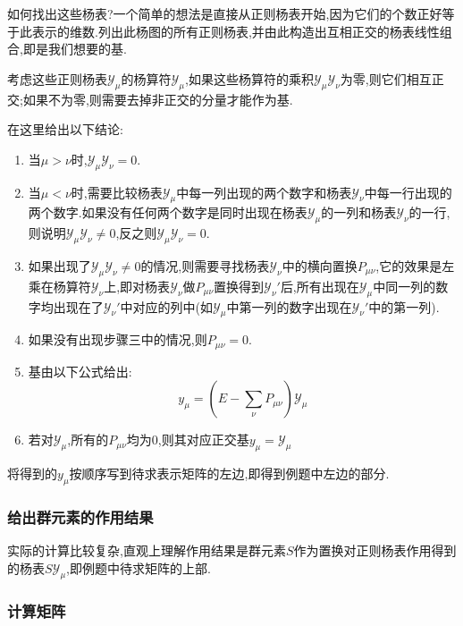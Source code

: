 \documentclass{ctexart}
\begin{document}
如何找出这些杨表?一个简单的想法是直接从正则杨表开始,因为它们的个数正好等于此表示的维数.列出此杨图的所有正则杨表,并由此构造出互相正交的杨表线性组合,即是我们想要的基.

考虑这些正则杨表$\mathcal{Y}_{\mu}$的杨算符$\mathcal{Y}_{\mu}$,如果这些杨算符的乘积$\mathcal{Y}_{\mu}\mathcal{Y}_{\nu}$为零,则它们相互正交;如果不为零,则需要去掉非正交的分量才能作为基.

在这里给出以下结论:
\begin{enumerate}
    \item 当$\mu>\nu$时,$\mathcal{Y}_{\mu}\mathcal{Y}_{\nu}=0$.
    \item 当$\mu<\nu$时,需要比较杨表$\mathcal{Y}_{\mu}$中每一列出现的两个数字和杨表$\mathcal{Y}_{\nu}$中每一行出现的两个数字.如果没有任何两个数字是同时出现在杨表$\mathcal{Y}_{\mu}$的一列和杨表$\mathcal{Y}_{\nu}$的一行,则说明$\mathcal{Y}_{\mu}\mathcal{Y}_{\nu}\neq 0$,反之则$\mathcal{Y}_{\mu}\mathcal{Y}_{\nu}=0$.
    \item 如果出现了$\mathcal{Y}_{\mu}\mathcal{Y}_{\nu}\neq 0$的情况,则需要寻找杨表$\mathcal{Y}_{\nu}$中的横向置换$P_{\mu\nu}$,它的效果是左乘在杨算符$\mathcal{Y}_{\nu}$上,即对杨表$\mathcal{Y}_{\nu}$做$P_{\mu\nu}$置换得到$\mathcal{Y}_{\nu}'$后,所有出现在$\mathcal{Y}_{\mu}$中同一列的数字均出现在了$\mathcal{Y}_{\nu}'$中对应的列中(如$\mathcal{Y}_{\mu}$中第一列的数字出现在$\mathcal{Y}_{\nu}'$中的第一列).
    \item 如果没有出现步骤三中的情况,则$P_{\mu\nu}=0$.
    \item 基由以下公式给出:\[y_{\mu}=\left(E-\sum_{\nu}P_{\mu\nu}\right)\mathcal{Y}_{\mu}\]
    \item 若对$\mathcal{Y}_{\mu}$,所有的$P_{\mu\nu}$均为0,则其对应正交基$y_{\mu}=\mathcal{Y}_{\mu}$
\end{enumerate}

将得到的$y_{\mu}$按顺序写到待求表示矩阵的左边,即得到例题中左边的部分.

\subsubsection{给出群元素的作用结果}

实际的计算比较复杂,直观上理解作用结果是群元素$S$作为置换对正则杨表作用得到的杨表$S\mathcal{Y}_{\mu}$,即例题中待求矩阵的上部.

\subsubsection{计算矩阵}
\end{document}
